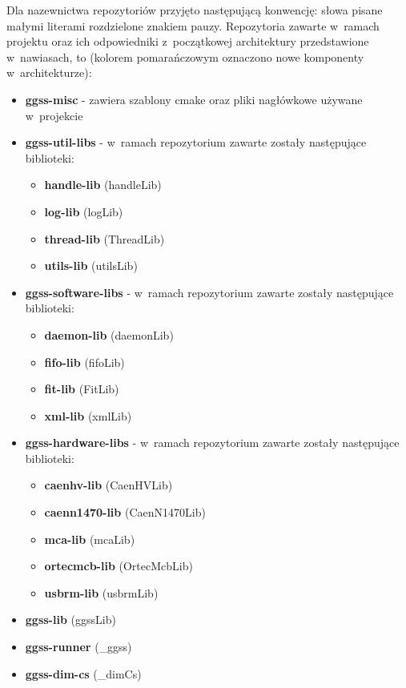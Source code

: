 Dla nazewnictwa repozytoriów przyjęto następującą konwencję: słowa pisane małymi literami rozdzielone znakiem pauzy. Repozytoria zawarte w~ramach projektu oraz ich odpowiedniki z~początkowej architektury przedstawione w~nawiasach, to (kolorem pomarańczowym oznaczono nowe komponenty w~architekturze): 
\begin{itemize}
\item \color{orangei} \textbf{ggss-misc} \color{black} - zawiera szablony \gls*{cmake} oraz pliki nagłówkowe używane w~projekcie
\item \color{orangei} \textbf{ggss-util-libs} \color{black} - w~ramach repozytorium zawarte zostały następujące biblioteki:
    \begin{itemize}
    \item \textbf{handle-lib} (handleLib)
    \item \textbf{log-lib} (logLib)
    \item \textbf{thread-lib} (ThreadLib)
    \item \textbf{utils-lib} (utilsLib)
    \end{itemize}
\item \color{orangei} \textbf{ggss-software-libs} \color{black} - w~ramach repozytorium zawarte zostały następujące biblioteki:
    \begin{itemize}
    \item \textbf{daemon-lib} (daemonLib) 
    \item \textbf{fifo-lib} (fifoLib)
    \item \textbf{fit-lib} (FitLib)
    \item \textbf{xml-lib} (xmlLib)
    \end{itemize}
\item \color{orangei} \textbf{ggss-hardware-libs} \color{black} - w~ramach repozytorium zawarte zostały następujące biblioteki:
    \begin{itemize}
    \item \textbf{caenhv-lib} (CaenHVLib)
    \item \textbf{caenn1470-lib} (CaenN1470Lib)
    \item \textbf{mca-lib} (mcaLib)
    \item \textbf{ortecmcb-lib} (OrtecMcbLib) 
    \item \textbf{usbrm-lib} (usbrmLib)
    \end{itemize}
\item \textbf{ggss-lib} (ggssLib)
\item \textbf{ggss-runner} (\_ggss)
\item \textbf{ggss-dim-cs} (\_dimCs)

\end{itemize}
